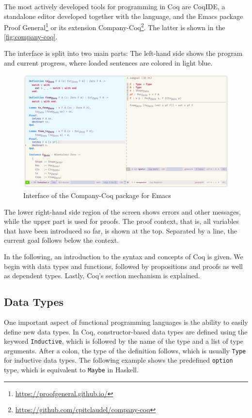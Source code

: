 \documentclass[a4paper, 11pt, fleqn, twoside, abstract=on]{scrreprt}
\newcommand{\hinl}[1]{\texttt{#1}}
\newcommand{\cinl}[1]{\texttt{#1}}
\begin{document}
The most actively developed tools for programming in Coq are CoqIDE, a standalone editor developed together with the language, and the Emacs package Proof General\footnote{\url{https://proofgeneral.github.io/}} or its extension Company-Coq\footnote{\url{https://github.com/cpitclaudel/company-coq}}.
The latter is shown in the \autoref{fig:company-coq}.

The interface is split into two main parts: The left-hand side shows the program and current progress, where loaded sentences are colored in light blue.
\begin{figure}
\begin{center}
\includegraphics[width=\textwidth]{img/coq.png}
\end{center}
\caption{Interface of the Company-Coq package for Emacs}
\label{fig:company-coq}
\end{figure}
\noindent
The lower right-hand side region of the screen shows errors and other messages, while the upper part is used for proofs.
The proof context, that is, all variables that have been introduced so far, is shown at the top.
Separated by a line, the current goal follows below the context.

In the following, an introduction to the syntax and concepts of Coq is given.
We begin with data types and functions, followed by propositions and proofs as well as dependent types.
Lastly, Coq's section mechanism is explained.

\subsection{Data Types}
\label{subsec:coqdatatypes}
One important aspect of functional programming languages is the ability to easily define new data types.
In Coq, constructor-based data types are defined using the keyword \cinl{Inductive}, which is followed by the name of the type and a list of type arguments.
After a colon, the type of the definition follows, which is usually \cinl{Type} for inductive data types.
The following example shows the predefined \cinl{option} type, which is equivalent to \hinl{Maybe} in Haskell.
\end{document}
